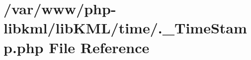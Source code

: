 \hypertarget{_8__TimeStamp_8php}{
\section{/var/www/php-\/libkml/libKML/time/.\_\-TimeStamp.php File Reference}
\label{d6/d37/_8__TimeStamp_8php}
}
